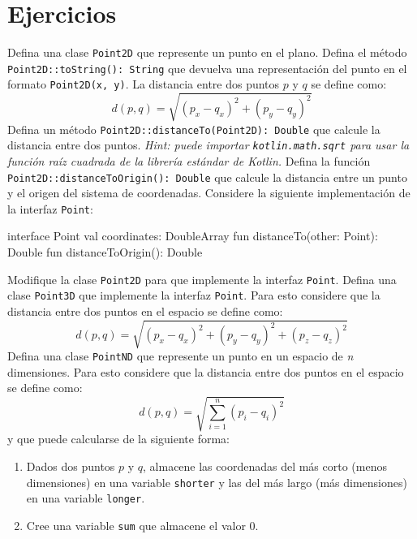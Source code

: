 \newpage
\section{Ejercicios}
  \label{sec:oop:principios:ejercicios}

  \begin{Exercise}[title={Puntos en el espacio}]
    \Question Defina una clase \texttt{Point2D} que represente un punto en el plano.
    \Question Defina el método \texttt{Point2D::toString(): String} que devuelva una representación del 
      punto en el formato \texttt{Point2D(x, y)}.
    \Question La distancia entre dos puntos \(p\) y \(q\) se define como:
      \[d(p, q) = \sqrt{(p_x - q_x)^2 + (p_y - q_y)^2}\]
      Defina un método \texttt{Point2D::distanceTo(Point2D): Double} que calcule la distancia entre dos 
      puntos.
      \textit{Hint: puede importar \texttt{kotlin.math.sqrt} para usar la función raíz cuadrada de 
      la librería estándar de \textit{Kotlin}.}
    \Question Defina la función \texttt{Point2D::distanceToOrigin(): Double} que calcule la 
      distancia entre un punto y el origen del sistema de coordenadas.
    \Question Considere la siguiente implementación de la interfaz \texttt{Point}:
      \begin{kotlin}
        interface Point {
          val coordinates: DoubleArray
          fun distanceTo(other: Point): Double
          fun distanceToOrigin(): Double
        }
      \end{kotlin}
      Modifique la clase \texttt{Point2D} para que implemente la interfaz \texttt{Point}.
    \Question Defina una clase \texttt{Point3D} que implemente la interfaz \texttt{Point}.
      Para esto considere que la distancia entre dos puntos en el espacio se define como:
      \[d(p, q) = \sqrt{(p_x - q_x)^2 + (p_y - q_y)^2 + (p_z - q_z)^2}\]
    \Question Defina una clase \texttt{PointND} que represente un punto en un espacio de 
      \textit{n} dimensiones.
      Para esto considere que la distancia entre dos puntos en el espacio se define como:
      \[d(p, q) = \sqrt{\sum_{i=1}^n (p_i - q_i)^2}\]
      y que puede calcularse de la siguiente forma:
      \begin{enumerate}
        \item Dados dos puntos \(p\) y \(q\), almacene las coordenadas del más corto (menos 
          dimensiones) en una variable \texttt{shorter} y las del más largo (más dimensiones) en una
          variable \texttt{longer}.
        \item Cree una variable \texttt{sum} que almacene el valor 0.

\end{enumerate}
\end{Exercise}

